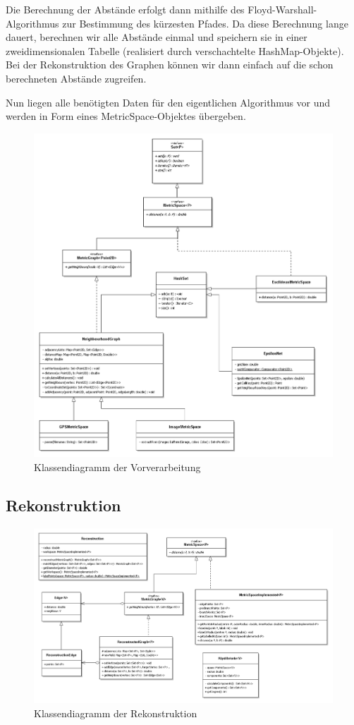 \documentclass[parskip=half,
 fontsize=12pt, bibtotoc,
 ngerman]
 {article}
\begin{document}
Die Berechnung der Abstände erfolgt dann mithilfe des Floyd-Warshall-Algorithmus zur Bestimmung des kürzesten Pfades. Da diese Berechnung lange dauert, berechnen wir alle Abstände einmal und speichern sie in einer zweidimensionalen Tabelle (realisiert durch verschachtelte HashMap-Objekte). Bei der Rekonstruktion des Graphen können wir dann einfach auf die schon berechneten Abstände zugreifen.

Nun liegen alle benötigten Daten für den eigentlichen Algorithmus vor und werden in Form eines MetricSpace-Objektes übergeben.

\begin{figure}[h]
\centering
\includegraphics[scale=0.5]{preprocessing.png}
\caption{Klassendiagramm der Vorverarbeitung}
\end{figure}

\subsection{Rekonstruktion}

\begin{figure}[h]
\centering
\includegraphics[scale=0.5]{main.png}
\caption{Klassendiagramm der Rekonstruktion}
\end{figure}
\end{document}
